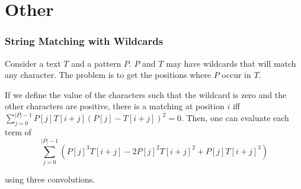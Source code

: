 \section{Other}

\subsubsection{String Matching with Wildcards}


Consider a text $T$ and a pattern $P$. $P$ and $T$ may have wildcards that will match any character. The problem is to get the positions where $P$ occur in $T$.

If we define the value of the characters such that the wildcard is zero and the other characters are positive, there is a matching at position $i$ iff $\sum_{j=0}^{|P|-1}P[j]T[i+j](P[j] - T[i + j])^2 = 0$. Then, one can evaluate each term of 
$$ \sum_{j=0}^{|P|-1}(P[j]^3T[i+j] - 2P[j]^2T[i+j]^2 + P[j]T[i + j]^3) $$ 

using three convolutions.


